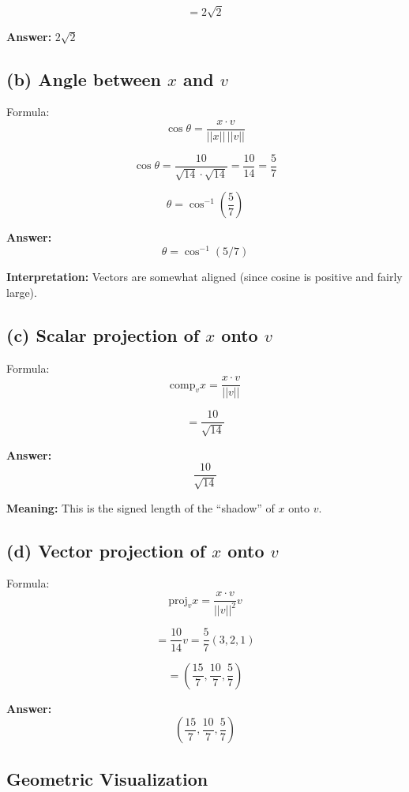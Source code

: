 \documentclass[11pt]{article}
\begin{document}
\[
= 2\sqrt{2}
\]

\textbf{Answer:} $2\sqrt{2}$

\hrulefill

\subsection*{(b) Angle between $x$ and $v$}

Formula:
\[
\cos\theta =
\frac{x \cdot v}{||x||\,||v||}
\]

\[
\cos\theta =
\frac{10}{\sqrt{14}\cdot \sqrt{14}}
=
\frac{10}{14}
=
\frac{5}{7}
\]

\[
\theta = \cos^{-1}\left(\frac{5}{7}\right)
\]

\textbf{Answer:}
\[
\theta = \cos^{-1}(5/7)
\]

\textbf{Interpretation:}
Vectors are somewhat aligned (since cosine is positive and fairly large).

\hrulefill

\subsection*{(c) Scalar projection of $x$ onto $v$}

Formula:
\[
\text{comp}_v x =
\frac{x \cdot v}{||v||}
\]

\[
=
\frac{10}{\sqrt{14}}
\]

\textbf{Answer:}
\[
\frac{10}{\sqrt{14}}
\]

\textbf{Meaning:}
This is the signed length of the ``shadow'' of $x$ onto $v$.

\hrulefill

\subsection*{(d) Vector projection of $x$ onto $v$}

Formula:
\[
\text{proj}_v x =
\frac{x \cdot v}{||v||^2} v
\]

\[
=
\frac{10}{14} v
=
\frac{5}{7}(3,2,1)
\]

\[
=
\left(
\frac{15}{7}, \frac{10}{7}, \frac{5}{7}
\right)
\]

\textbf{Answer:}
\[
\left(
\frac{15}{7}, \frac{10}{7}, \frac{5}{7}
\right)
\]

\hrulefill

\subsection*{Geometric Visualization}
\end{document}
